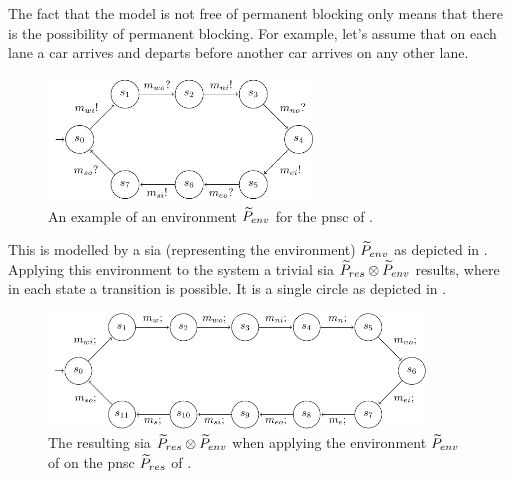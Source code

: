 The fact that the model is not free of permanent blocking only means that there is the possibility of permanent blocking.
For example, let's assume that on each lane a car arrives and departs before another car arrives on any other lane.
\begin{figure}[bht]
    \TopFigSpace
    \centering
    \includegraphics[width=7cm]{fig/cross_simple_env.pdf}
    \CaptionFigSpace
    \caption{An example of an environment $\widetilde{P}_{env}$ for the \gls{pnsc} of \Fig{\ref{fig_cross_proc_sia_dl}}.}
    \label{fig_cross_simple_env}
    \BotFigSpace
\end{figure}
This is modelled by a \gls{sia} (representing the environment) $\widetilde{P}_{env}$ as depicted in \Fig{\ref{fig_cross_simple_env}}.
Applying this environment to the system a trivial \gls{sia} $\widetilde{P}_{res} \otimes \widetilde{P}_{env}$ results, where in each state a transition is possible.
It is a single circle as depicted in \Fig{\ref{fig_cross_simple_res}}.
\begin{figure}[bht]
    \TopFigSpace
    \centering
    \includegraphics[width=10cm]{fig/cross_simple_res.pdf}
    \CaptionFigSpace
    \caption{The resulting \gls{sia} $\widetilde{P}_{res} \otimes \widetilde{P}_{env}$ when applying the environment $\widetilde{P}_{env}$ of \Fig{\ref{fig_cross_simple_env}} on the \gls{pnsc} $\widetilde{P}_{res}$ of \Fig{\ref{fig_cross_proc_sia_dl}}.}
    \label{fig_cross_simple_res}
    \BotFigSpace
\end{figure}

